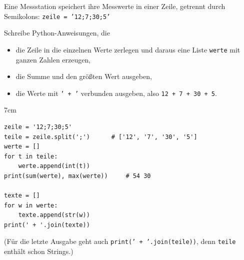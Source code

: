 \question[5]
Eine Messstation speichert ihre Messwerte in einer Zeile, getrennt durch Semikolons:
\texttt{zeile = '12;7;30;5'}

Schreibe Python-Anweisungen, die
\begin{itemize}
\item die Zeile in die einzelnen Werte zerlegen und daraus eine Liste \texttt{werte} mit ganzen Zahlen erzeugen,
\item die Summe und den größten Wert ausgeben,
\item die Werte mit \texttt{' + '} verbunden ausgeben, also \texttt{12 + 7 + 30 + 5}.
\end{itemize}

\begin{solutionbox}{7cm}
\begin{lstlisting}
zeile = '12;7;30;5'
teile = zeile.split(';')      # ['12', '7', '30', '5']
werte = []
for t in teile:
    werte.append(int(t))
print(sum(werte), max(werte))     # 54 30

texte = []
for w in werte:
    texte.append(str(w))
print(' + '.join(texte))
\end{lstlisting}
(Für die letzte Ausgabe geht auch \texttt{print(' + '.join(teile))}, denn \texttt{teile} enthält schon Strings.)
\end{solutionbox}

